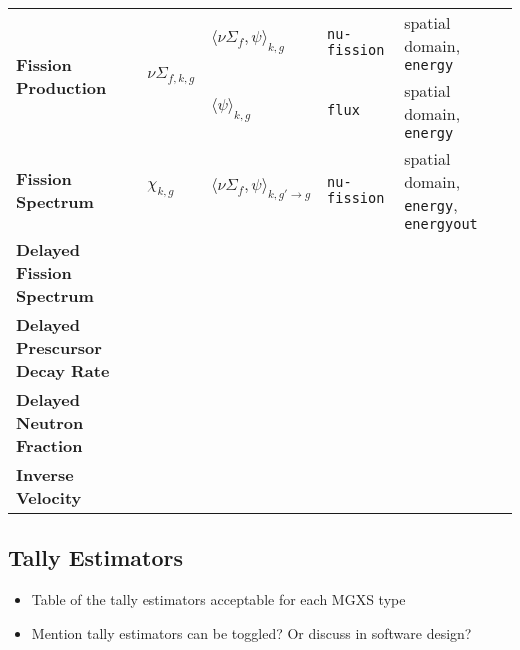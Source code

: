 \begin{table}[h!]
\begin{tabular}{ m{2.3cm} m{1.2cm} m{2cm} m{2.5cm} l }
  \midrule

  \multirow{2}{*}{\parbox{1.5cm}{\bf Fission \hspace{1cm} Production}} & \multirow{2}{*}{$\nu\Sigma_{f,k,g}$} & $\langle \nu\Sigma_{f}, \psi \rangle_{k,g}$ & \texttt{nu-fission} & spatial domain, \texttt{energy} \\
  \cline{3-5}
  & & $\langle \psi \rangle_{k,g}$ & \texttt{flux} & spatial domain, \texttt{energy} \\

  \midrule
  
  \parbox{1.5cm}{\parbox{1.2cm}{\bf Fission Spectrum}} & $\chi_{k,g}$ & $\langle \nu\Sigma_{f}, \psi \rangle_{k,g'\rightarrow g}$ & \texttt{nu-fission} & spatial domain, \texttt{energy}, \texttt{energyout} \\

  \midrule

  \parbox{1.5cm}{\parbox{1.9cm}{\bf Delayed Fission Spectrum}} & & & \\

  \midrule

  \parbox{1.5cm}{\parbox{2.3cm}{\bf Delayed Prescursor Decay Rate}} & & & \\

  \midrule

  \parbox{1.5cm}{\parbox{2cm}{\bf Delayed Neutron Fraction}} & & & \\

  \midrule

  \parbox{1.5cm}{\parbox{1.2cm}{\bf Inverse Velocity}} & & & \\

  \midrule

\end{tabular}
\end{table}


\subsection{Tally Estimators}
\label{subsec:tally-est}

\begin{itemize}[noitemsep]
\item Table of the tally estimators acceptable for each MGXS type
\item Mention tally estimators can be toggled? Or discuss in software design?
\end{itemize}